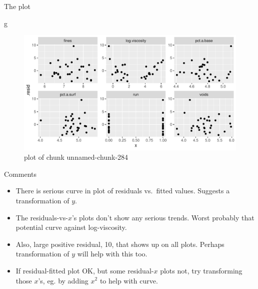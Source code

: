 \documentclass[ignorenonframetext,]{beamer}
\newenvironment{Shaded}{\begin{snugshade}}{\end{snugshade}}
\newcommand{\NormalTok}[1]{#1}
\providecommand{\tightlist}{%
  \setlength{\itemsep}{0pt}\setlength{\parskip}{0pt}}
\begin{document}
\begin{frame}[fragile]{The plot}
\protect\hypertarget{the-plot-3}{}

\begin{Shaded}
\begin{Highlighting}[]
\NormalTok{g}
\end{Highlighting}
\end{Shaded}

\begin{figure}
\centering
\includegraphics{figure/unnamed-chunk-284-1.pdf}
\caption{plot of chunk unnamed-chunk-284}
\end{figure}

\end{frame}

\begin{frame}{Comments}
\protect\hypertarget{comments-20}{}

\begin{itemize}
\tightlist
\item
  There is serious curve in plot of residuals vs.~fitted values.
  Suggests a transformation of \(y\).
\item
  The residuals-vs-\(x\)'s plots don't show any serious trends. Worst
  probably that potential curve against log-viscosity.
\item
  Also, large positive residual, 10, that shows up on all plots. Perhaps
  transformation of \(y\) will help with this too.
\item
  If residual-fitted plot OK, but some residual-\(x\) plots not, try
  transforming those \(x\)'s, eg. by adding \(x^2\) to help with curve.
\end{itemize}

\end{frame}
\end{document}
